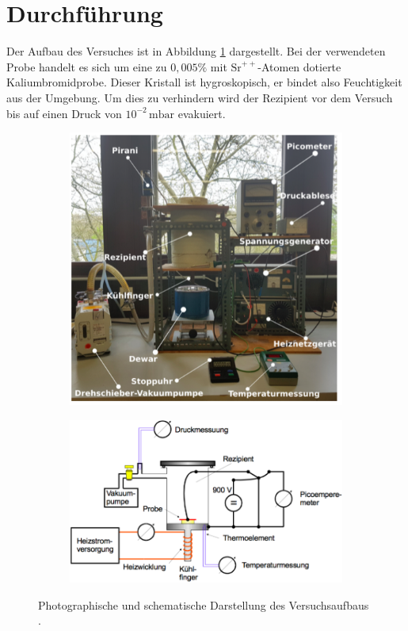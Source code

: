 \section{Durchführung}
\label{sec:Durchführung}
Der Aufbau des Versuches ist in Abbildung \ref{fig:tfig3} dargestellt. 
Bei der verwendeten Probe handelt es sich um eine zu $0,005\%$ mit $\text{Sr}^{++}$-Atomen dotierte Kaliumbromidprobe.
Dieser Kristall ist hygroskopisch, er bindet also Feuchtigkeit aus der Umgebung.
Um dies zu verhindern wird der Rezipient vor dem Versuch bis auf einen Druck von $10^{-2}\,\text{mbar}$ evakuiert.

\begin{figure}[H]
    \begin{subfigure}{0.40\textwidth}
    \centering
    \includegraphics[width=\linewidth]{figs/aufbau}
    \end{subfigure}
    \begin{subfigure}{0.58\textwidth}
    \centering
    \includegraphics[width=1.1\linewidth]{figs/aufbau2}
    \end{subfigure}
    \caption{Photographische und schematische Darstellung des Versuchsaufbaus \cite{skript}.}
    \label{fig:tfig3}
\end{figure}

